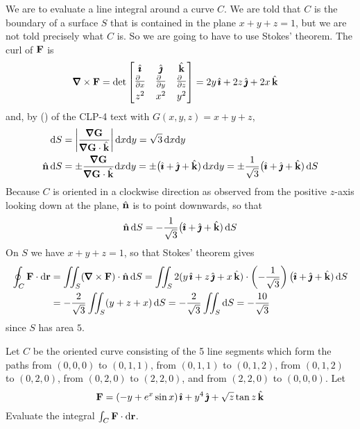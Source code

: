 \begin{solution}
We are to evaluate a line integral around a curve $C$. We are told that 
$C$ is the boundary of a surface $S$ that is contained in the plane 
$x+y+z=1$, but we are not told precisely what $C$ is. So we are going to have to use Stokes' theorem. The curl of $\mathbf{F}$ is
\begin{align*}
\vnabla\times\vF
&=\det\left[\begin{matrix}
\hi &\hj &\hk \\
\tfrac{\partial\hfill}{\partial x} & \tfrac{\partial\hfill}{\partial y} & 
                \tfrac{\partial\hfill}{\partial z} \\[0.05in]
z^2 & x^2 & y^2
\end{matrix}
\right]
= 2y\,\hi + 2z\,\hj +2x\,\hk
\end{align*}
and, by () of the CLP-4 text with 
$G(x,y,z)=x+y+z$, 
\begin{align*}
\dee{S} &= \left|\frac{\vnabla\vG}{\vnabla\vG\cdot\hk}\right|\dee{x}\dee{y}
        =\sqrt{3}\,\dee{x}\dee{y} \\
\hn\,\dee{S} &= \pm \frac{\vnabla\vG}{\vnabla\vG\cdot\hk}\dee{x}\dee{y}
= \pm \big(\hi+\hj+\hk)\,\dee{x}\dee{y}
= \pm \frac{1}{\sqrt{3}} \big(\hi+\hj+\hk)\,\dee{S}
\end{align*}
Because $C$ is oriented in a clockwise direction as 
observed from the positive $z$-axis looking down at the plane, 
$\hat{\mathbf{n}}$ is to point downwards, so that
\begin{equation*}
\hat{\mathbf{n}}\,\mathrm{d}S = -\frac{1}{\sqrt{3}} \big(\hat{\pmb{\imath}}+\hat{\pmb{\jmath}}+\hat{\mathbf{k}})\,\mathrm{d}S
\end{equation*}
On $S$ we have $x+y+z=1$, so that Stokes' theorem gives
\begin{align*}
\oint_C\vF\cdot\dee{\vr}
&=\dblInt_S (\vnabla\times\vF)\cdot\hn\,\dee{S}
=\dblInt_S 2(y\,\hi+z\,\hj+x\,\hk)\cdot
        \left(-\frac{1}{\sqrt{3}}\right) \big(\hi+\hj+\hk)\,\dee{S} \\
&=-\frac{2}{\sqrt{3}}\dblInt_S (y+z+x)\,\dee{S}
=-\frac{2}{\sqrt{3}}\dblInt_S \dee{S}
=-\frac{10}{\sqrt{3}}
\end{align*}
since $S$ has area $5$.
\end{solution}

\begin{question}[M317 2008A] %
Let $C$ be the oriented curve consisting of the 5 line segments which 
form the paths from $(0, 0, 0)$ to $(0, 1, 1)$, 
               from $(0, 1, 1)$ to $(0, 1, 2)$, 
               from $(0, 1, 2)$ to $(0, 2, 0)$, 
               from $(0, 2, 0)$ to $(2, 2, 0)$,
           and from $(2, 2, 0)$ to $(0, 0, 0)$. 
Let
\begin{equation*}
\mathbf{F} = (-y+e^x\sin x)\,\hat{\pmb{\imath}}
         +y^4\,\hat{\pmb{\jmath}}
         +\sqrt{z}\tan z\,\hat{\mathbf{k}}
\end{equation*}
Evaluate the integral $\int_C\mathbf{F}\cdot\mathrm{d}\mathbf{r}$.
\end{question}


